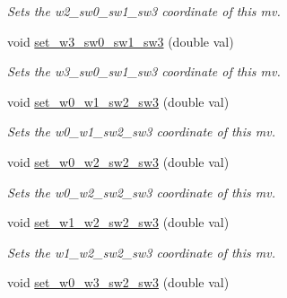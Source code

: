 \begin{DoxyCompactItemize}
\begin{DoxyCompactList}\small\item\em Sets the w2\-\_\-sw0\-\_\-sw1\-\_\-sw3 coordinate of this mv. \end{DoxyCompactList}\item 
\hypertarget{classe3ga_1_1mv_adae82022b398a665f1cefadadc5e09cb}{void \hyperlink{classe3ga_1_1mv_adae82022b398a665f1cefadadc5e09cb}{set\-\_\-w3\-\_\-sw0\-\_\-sw1\-\_\-sw3} (double val)}\label{classe3ga_1_1mv_adae82022b398a665f1cefadadc5e09cb}

\begin{DoxyCompactList}\small\item\em Sets the w3\-\_\-sw0\-\_\-sw1\-\_\-sw3 coordinate of this mv. \end{DoxyCompactList}\item 
\hypertarget{classe3ga_1_1mv_a4994784fb19210049257f7217065e364}{void \hyperlink{classe3ga_1_1mv_a4994784fb19210049257f7217065e364}{set\-\_\-w0\-\_\-w1\-\_\-sw2\-\_\-sw3} (double val)}\label{classe3ga_1_1mv_a4994784fb19210049257f7217065e364}

\begin{DoxyCompactList}\small\item\em Sets the w0\-\_\-w1\-\_\-sw2\-\_\-sw3 coordinate of this mv. \end{DoxyCompactList}\item 
\hypertarget{classe3ga_1_1mv_abf0aad45f97e02371998b5bb585daf6d}{void \hyperlink{classe3ga_1_1mv_abf0aad45f97e02371998b5bb585daf6d}{set\-\_\-w0\-\_\-w2\-\_\-sw2\-\_\-sw3} (double val)}\label{classe3ga_1_1mv_abf0aad45f97e02371998b5bb585daf6d}

\begin{DoxyCompactList}\small\item\em Sets the w0\-\_\-w2\-\_\-sw2\-\_\-sw3 coordinate of this mv. \end{DoxyCompactList}\item 
\hypertarget{classe3ga_1_1mv_ab960bd5cb450ce964b11ccf0c4c8eeb3}{void \hyperlink{classe3ga_1_1mv_ab960bd5cb450ce964b11ccf0c4c8eeb3}{set\-\_\-w1\-\_\-w2\-\_\-sw2\-\_\-sw3} (double val)}\label{classe3ga_1_1mv_ab960bd5cb450ce964b11ccf0c4c8eeb3}

\begin{DoxyCompactList}\small\item\em Sets the w1\-\_\-w2\-\_\-sw2\-\_\-sw3 coordinate of this mv. \end{DoxyCompactList}\item 
\hypertarget{classe3ga_1_1mv_abf2b94200c9983c8dd20d7380f741739}{void \hyperlink{classe3ga_1_1mv_abf2b94200c9983c8dd20d7380f741739}{set\-\_\-w0\-\_\-w3\-\_\-sw2\-\_\-sw3} (double val)}\label{classe3ga_1_1mv_abf2b94200c9983c8dd20d7380f741739}


\end{DoxyCompactItemize}
